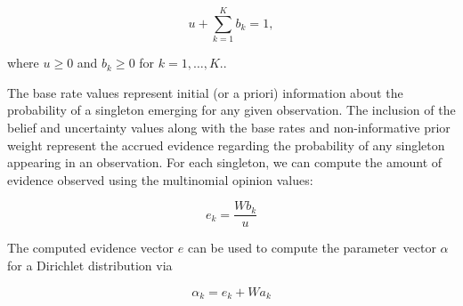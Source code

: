 \documentclass[a4,12pt]{ozu-thesis}
\begin{document}
\begin{equation}
\label{eq:sum}
 u + \sum_{k=1}^{K} b_{k} = 1,
\end{equation}


\begin{center}
where $u\geq 0 $ and $b_{k}\geq 0 $ for $k = 1,\ldots, K $..
\end{center}








The base rate values represent initial (or a priori) information about the probability of a singleton emerging for any given observation. The inclusion of the belief and uncertainty values along with the base rates and non-informative prior weight represent the accrued evidence regarding the probability of any singleton appearing in an observation. For each singleton, we can compute the amount of evidence observed using the multinomial opinion values:

\begin{equation}
\label{eq:std}
e_{k} = \frac{W b_{k}}{u}
\end{equation}


The computed evidence vector $e$ can be used to compute the parameter vector $\alpha$ for a Dirichlet distribution via


\begin{equation}
\alpha_{k} = e_{k} + Wa_{k}
\end{equation}
 
\end{document}
